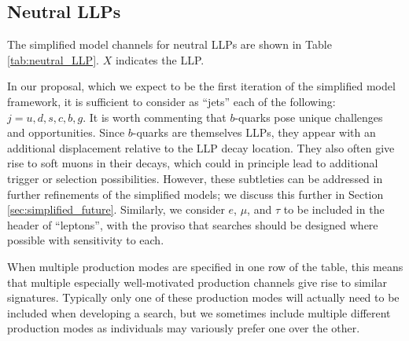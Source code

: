 \subsection{Neutral LLPs}

The simplified model channels for neutral LLPs are shown in Table
\ref{tab:neutral_LLP}.  $X$ indicates the
LLP.

 
 In our proposal, which we expect to be the first iteration of the simplified
model framework, it is sufficient to consider as ``jets'' each of the
following:~$j=u,d,s,c,b,g$. It is worth commenting that $b$-quarks pose
unique challenges and opportunities. Since $b$-quarks are themselves
LLPs, they appear with an additional displacement relative to the LLP
decay location. They also often give rise to soft muons in their
decays, which could in principle lead to additional trigger or
selection possibilities.  However, these subtleties can be addressed
in further refinements of the simplified models; we discuss this further in Section
\ref{sec:simplified_future}. Similarly, we consider $e$,
$\mu$, and $\tau$ to be included in the header of ``leptons'', with the proviso that
searches should be designed where possible with sensitivity to each.
 
When multiple production modes are specified in one row of the table, this means that multiple
 especially well-motivated production channels give rise to similar
signatures. Typically only one of these production modes will actually need to
be included when developing a search, but we sometimes include multiple different production modes
as individuals may variously prefer one over the other. 


